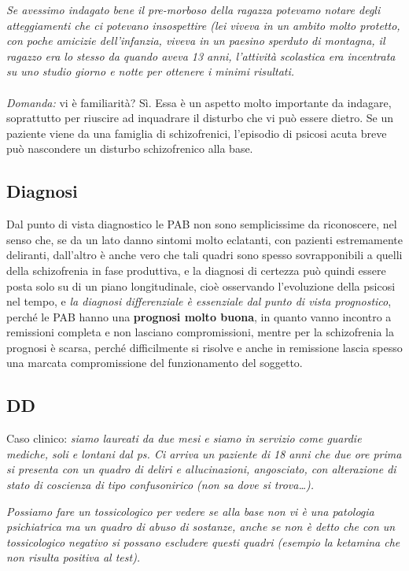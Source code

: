 \emph{Se avessimo indagato bene il pre-morboso della ragazza potevamo
notare degli atteggiamenti che ci potevano insospettire (lei viveva in
un ambito molto protetto, con poche amicizie dell'infanzia, viveva in un
paesino sperduto di montagna, il ragazzo era lo stesso da quando aveva
13 anni, l'attività scolastica era incentrata su uno studio giorno e
notte per ottenere i minimi risultati. }
\\\\
\emph{Domanda:} vi è familiarità? Sì. Essa è un aspetto molto importante
da indagare, soprattutto per riuscire ad inquadrare il disturbo che vi
può essere dietro. Se un paziente viene da una famiglia di
schizofrenici, l'episodio di psicosi acuta breve può nascondere un
disturbo schizofrenico alla base.

\subsection{Diagnosi}

Dal punto di vista diagnostico le PAB non sono semplicissime da
riconoscere, nel senso che, se da un lato danno sintomi molto eclatanti,
con pazienti estremamente deliranti, dall'altro è anche vero che tali
quadri sono spesso sovrapponibili a quelli della schizofrenia in fase
produttiva, e la diagnosi di certezza può quindi essere posta solo su di
un piano longitudinale, cioè osservando l'evoluzione della psicosi nel
tempo, e \emph{la diagnosi differenziale è essenziale dal punto di vista
prognostico}, perché le PAB hanno una \textbf{prognosi molto buona}, in
quanto vanno incontro a remissioni completa e non lasciano
compromissioni, mentre per la schizofrenia la prognosi è scarsa, perché
difficilmente si risolve e anche in remissione lascia spesso una marcata
compromissione del funzionamento del soggetto.

\subsection{DD}

Caso clinico: \emph{siamo laureati da due mesi e siamo in servizio come
guardie mediche, soli e lontani dal ps. Ci arriva un paziente di 18 anni
che due ore prima si presenta con un quadro di deliri e allucinazioni,
angosciato, con alterazione di stato di coscienza di tipo confusonirico
(non sa dove si trova\ldots{}). }

\emph{Possiamo fare un \emph{tossicologico} per vedere se alla base non
vi è una patologia psichiatrica ma un quadro di abuso di sostanze, anche
se non è detto che con un tossicologico negativo si possano escludere
questi quadri (esempio la ketamina che non risulta positiva al test).}

